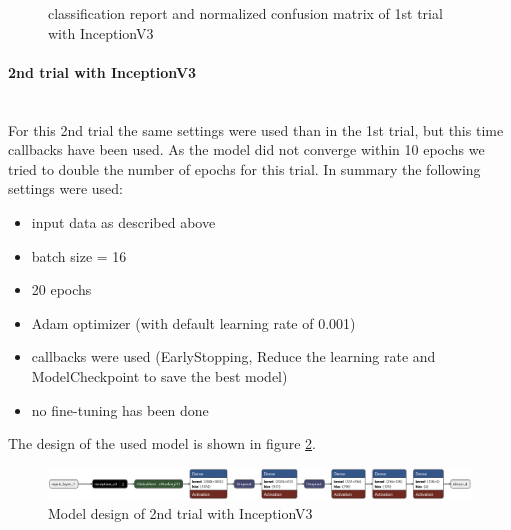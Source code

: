 \documentclass{article}
\begin{document}
\begin{figure}[ht]
  \centering
  \qquad
  \caption{classification report and normalized confusion matrix of 1st trial with InceptionV3}
  \label{fig:inceptionv3_04_results}
\end{figure}



\paragraph{2nd trial with InceptionV3}\mbox{}\\
For this 2nd trial the same settings were used than in the 1st trial, but this time callbacks have been used. As the model did not converge within 10 epochs we tried to double the number of epochs for this trial. In summary the following settings were used: 
\begin{itemize}
\item input data as described above
\item batch size = 16
\item 20 epochs 
\item Adam optimizer (with default learning rate of 0.001)
\item callbacks were used (EarlyStopping, Reduce the learning rate and ModelCheckpoint to save the best model)
\item no fine-tuning has been done
\end{itemize}

The design of the used model is shown in figure \ref{fig:inceptionv3_05.keras_model_design}.
\begin{figure}[htb] %
    \centering
    \includegraphics[width=1.0\linewidth]{inceptionv3_05.keras_model_design_nice.png}
    \caption{Model design of 2nd trial with InceptionV3}
    \label{fig:inceptionv3_05.keras_model_design}
\end{figure}
\end{document}
